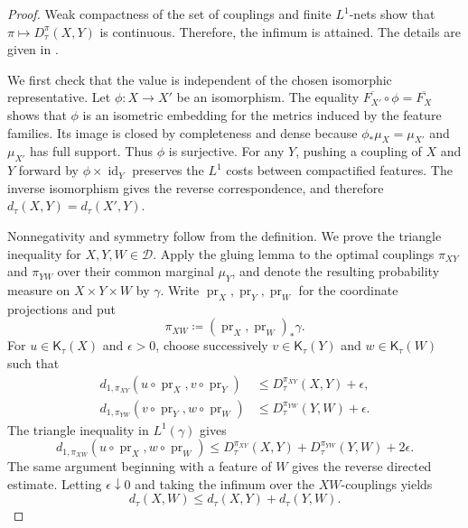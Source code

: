 \documentclass[11pt]{amsart}
\theoremstyle{plain}
\theoremstyle{definition}
\theoremstyle{remark}
\newcommand{\D}{\mathcal D}
\newcommand{\Kc}{\mathsf K}
\newcommand{\dtau}{d_{\tau}}
\DeclareMathOperator{\pr}{pr}
\begin{document}
\begin{proof}
Weak compactness of the set of couplings \cite[Lemma~2.10]{gds1} and finite $L^1$-nets show that $\pi\mapsto D_\tau^\pi(X,Y)$ is continuous. Therefore, the infimum is attained. The details are given in .

We first check that the value is independent of the chosen isomorphic representative. Let $\phi\colon X\to X'$ be an isomorphism. The equality $\overline{F_{X'}}\circ\phi=\overline{F_X}$ shows that $\phi$ is an isometric embedding for the metrics induced by the feature families. Its image is closed by completeness and dense because $\phi_*\mu_X=\mu_{X'}$ and $\mu_{X'}$ has full support. Thus $\phi$ is surjective. For any $Y$, pushing a coupling of $X$ and $Y$ forward by $\phi\times\operatorname{id}_Y$ preserves the $L^1$ costs between compactified features. The inverse isomorphism gives the reverse correspondence, and therefore $\dtau(X,Y)=\dtau(X',Y)$.

Nonnegativity and symmetry follow from the definition. We prove the triangle inequality for $X,Y,W\in\D$. Apply the gluing lemma \cite[Lemma~7.6]{villani2009optimal} to the optimal couplings $\pi_{XY}$ and $\pi_{YW}$ over their common marginal $\mu_Y$, and denote the resulting probability measure on $X\times Y\times W$ by $\gamma$. Write $\pr_X,\pr_Y,\pr_W$ for the coordinate projections and put
\[
\pi_{XW}\coloneqq(\pr_X,\pr_W)_*\gamma.
\]
For $u\in\Kc_\tau(X)$ and $\epsilon>0$, choose successively $v\in\Kc_\tau(Y)$ and $w\in\Kc_\tau(W)$ such that
\[
\begin{aligned}
d_{1,\pi_{XY}}(u\circ\pr_X,v\circ\pr_Y)
&\leq D_\tau^{\pi_{XY}}(X,Y)+\epsilon,\\
d_{1,\pi_{YW}}(v\circ\pr_Y,w\circ\pr_W)
&\leq D_\tau^{\pi_{YW}}(Y,W)+\epsilon.
\end{aligned}
\]
The triangle inequality in $L^1(\gamma)$ gives
\[
d_{1,\pi_{XW}}(u\circ\pr_X,w\circ\pr_W)
\leq D_\tau^{\pi_{XY}}(X,Y)+D_\tau^{\pi_{YW}}(Y,W)+2\epsilon.
\]
The same argument beginning with a feature of $W$ gives the reverse directed estimate. Letting $\epsilon\downarrow0$ and taking the infimum over the $XW$-couplings yields
\[
\dtau(X,W)\leq\dtau(X,Y)+\dtau(Y,W).
\]


\end{proof}
\end{document}
